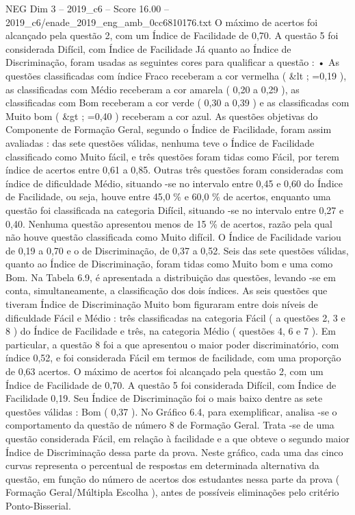 \begin{textsample}{NEG Dim 3 – 2019\_c6 – Score 16.00 – 2019\_c6/enade\_2019\_eng\_amb\_0cc6810176.txt}
O máximo de acertos foi alcançado pela questão 2, com um Índice de Facilidade de 0,70.
A questão 5 foi considerada Difícil, com Índice de Facilidade Já quanto ao Índice de Discriminação, foram usadas as seguintes cores para qualificar a questão : • As questões classificadas com índice Fraco receberam a cor vermelha ( \&lt ; =0,19 ), as classificadas com Médio receberam a cor amarela ( 0,20 a 0,29 ), as classificadas com Bom receberam a cor verde ( 0,30 a 0,39 ) e as classificadas com Muito bom ( \&gt ; =0,40 ) receberam a cor azul.
As questões objetivas do Componente de Formação Geral, segundo o Índice de Facilidade, foram assim avaliadas : das sete questões válidas, nenhuma teve o Índice de Facilidade classificado como Muito fácil, e três questões foram tidas como Fácil, por terem índice de acertos entre 0,61 a 0,85.
Outras três questões foram consideradas com índice de dificuldade Médio, situando -se no intervalo entre 0,45 e 0,60 do Índice de Facilidade, ou seja, houve entre 45,0 \% e 60,0 \% de acertos, enquanto uma questão foi classificada na categoria Difícil, situando -se no intervalo entre 0,27 e 0,40.
Nenhuma questão apresentou menos de 15 \% de acertos, razão pela qual não houve questão classificada como Muito difícil.
O Índice de Facilidade variou de 0,19 a 0,70 e o de Discriminação, de 0,37 a 0,52.
Seis das sete questões válidas, quanto ao Índice de Discriminação, foram tidas como Muito bom e uma como Bom.
Na Tabela 6.9, é apresentada a distribuição das questões, levando -se em conta, simultaneamente, a classificação dos dois índices.
As seis questões que tiveram Índice de Discriminação Muito bom figuraram entre dois níveis de dificuldade Fácil e Médio : três classificadas na categoria Fácil ( a questões 2, 3 e 8 ) do Índice de Facilidade e três, na categoria Médio ( questões 4, 6 e 7 ).
Em particular, a questão 8 foi a que apresentou o maior poder discriminatório, com índice 0,52, e foi considerada Fácil em termos de facilidade, com uma proporção de 0,63 acertos.
O máximo de acertos foi alcançado pela questão 2, com um Índice de Facilidade de 0,70.
A questão 5 foi considerada Difícil, com Índice de Facilidade 0,19.
Seu Índice de Discriminação foi o mais baixo dentre as sete questões válidas : Bom ( 0,37 ).
No Gráfico 6.4, para exemplificar, analisa -se o comportamento da questão de número 8 de Formação Geral.
Trata -se de uma questão considerada Fácil, em relação à facilidade e a que obteve o segundo maior Índice de Discriminação dessa parte da prova.
Neste gráfico, cada uma das cinco curvas representa o percentual de respostas em determinada alternativa da questão, em função do número de acertos dos estudantes nessa parte da prova ( Formação Geral/Múltipla Escolha ), antes de possíveis eliminações pelo critério Ponto-Bisserial.

\end{textsample}
